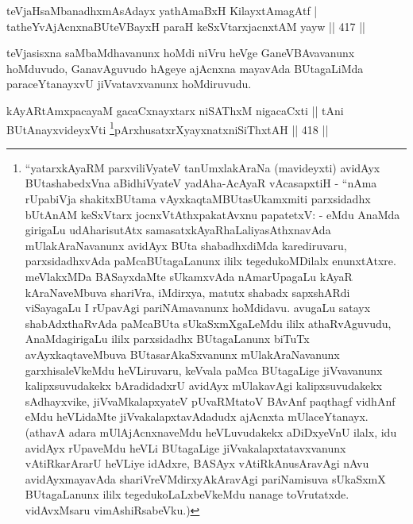 

\begin{shl}
teVjaHsaMbanadhxmAsAdayx yathA\s maBxH KilayxtAmagAtf |
tatheYvAjAcnxnaBUteVBayxH paraH keSxVtarxjacnxtAM yayw \hfill  || 417 ||
\end{shl}

\begin{artha}
teVjasisxna saMbaMdhavanunx hoMdi niVru heVge GaneVBAvavanunx hoMduvudo, GanavAguvudo hAgeye ajAcnxna mayavAda BUtagaLiMda paraceYtanayxvU jiVvatavxvanunx hoMdiruvudu.
\end{artha}


\begin{shl}
kAyARtAmx\s pacayaM gacaCxnayxtarx niSAThxM nigacaCxti ||
tAni BUtAnayxvideyxVti \footnote{``yatarxkAyaRM parxviliVyateV tanUmxlakAraNa (mavideyxti)
avidAyx BUtashabedxVna aBidhiVyateV yadAha-AcAyaR vAcasapxtiH - ``nAma
rUpabiVja shakitxBUtama vAyxkaqtaMBUtasUkamxmiti parxsidadhx bUtAnAM
keSxVtarx jocnxVtAthxpakatAvxnu papatetxV: -
eMdu AnaMda girigaLu udAharisutAtx samasatxkAyaRhaLaliyasAthxnavAda
mUlakAraNavanunx avidAyx BUta shabadhxdiMda karediruvaru,
parxsidadhxvAda paMcaBUtagaLanunx ililx tegedukoMDilalx
enunxtAtxre. meVlakxMDa BASayxdaMte sUkamxvAda nAmarUpagaLu kAyaR
kAraNaveMbuva shariVra, iMdirxya, matutx shabadx sapxshARdi viSayagaLu
I rUpavAgi pariNAmavanunx hoMdidavu. avugaLu satayx shabAdxthaRvAda
paMcaBUta sUkaSxmXgaLeMdu ililx athaRvAguvudu, AnaMdagirigaLu ililx
parxsidadhx BUtagaLanunx biTuTx avAyxkaqtaveMbuva BUtasarAkaSxvanunx
mUlakAraNavanunx garxhisaleVkeMdu heVLiruvaru, keVvala paMca
BUtagaLige jiVvavanunx kalipxsuvudakekx bAradidadxrU avidAyx
mUlakavAgi kalipxsuvudakekx sAdhayxvike, jiVvaMkalapxyateV pUvaRMtatoV
BAvAnf paqthagf vidhAnf eMdu heVLidaMte jiVvakalapxtavAdadudx ajAcnxta
mUlaceYtanayx. (athavA adara mUlAjAcnxnaveMdu heVLuvudakekx aDiDxyeVnU
ilalx, idu avidAyx rUpaveMdu heVLi BUtagaLige jiVvakalapxtatavxvanunx
vAtiRkarArarU heVLiye idAdxre, BASAyx vAtiRkAnusAravAgi nAvu
avidAyxmayavAda shariVreVMdirxyAkAravAgi pariNamisuva sUkaSxmX
BUtagaLanunx ililx tegedukoLaLxbeVkeMdu nanage
toVrutatxde. vidAvxMsaru vimAshiRsabeVku.)}pArxhusatxrXyayxnatxniSiThxtAH \hfill  || 418 ||
\end{shl}

